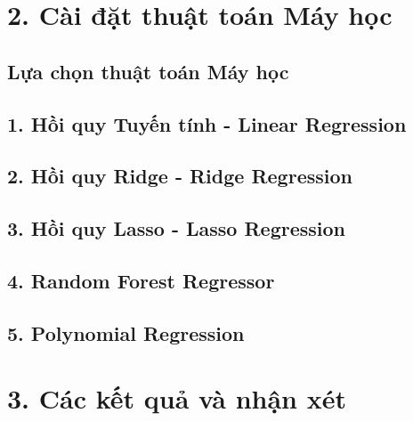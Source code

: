 \documentclass{article}
\begin{document}
	\section{2. Cài đặt thuật toán Máy học}
	
	\subsection{Lựa chọn thuật toán Máy học}
		
	\subsection{1. Hồi quy Tuyến tính - Linear Regression}
	
	\subsection{2. Hồi quy Ridge - Ridge Regression}
	
	\subsection{3. Hồi quy Lasso - Lasso Regression}
	
	\subsection{4. Random Forest Regressor}
	
	\subsection{5. Polynomial Regression}
	
	\section{3. Các kết quả và nhận xét}
	
	\nocite{*}
	\newpage\cleardoublepage
	
	
\end{document}
